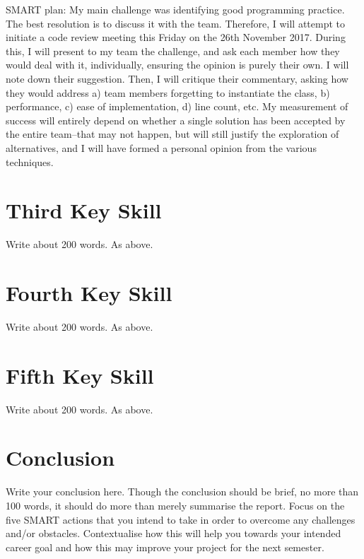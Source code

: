\documentclass{scrartcl}
\begin{document}
SMART plan:
My main challenge was identifying good programming practice. The best resolution is to discuss it with the team. Therefore, I will attempt to initiate a code review meeting this Friday on the 26th November 2017. During this, I will present to my team the challenge, and ask each member how they would deal with it, individually, ensuring the opinion is purely their own. I will note down their suggestion. Then, I will critique their commentary, asking how they would address a) team members forgetting to instantiate the class, b) performance, c) ease of implementation, d) line count, etc. My measurement of success will entirely depend on whether a single solution has been accepted by the entire team--that may not happen, but will still justify the exploration of alternatives, and I will have formed a personal opinion from the various techniques.

\section{Third Key Skill}

Write about 200 words. As above.

\section{Fourth Key Skill}

Write about 200 words. As above.

\section{Fifth Key Skill}

Write about 200 words. As above.

\section{Conclusion}

Write your conclusion here. Though the conclusion should be brief, no more than 100 words, it should do more than merely summarise the report. Focus on the five SMART actions that you intend to take in order to overcome any challenges and/or obstacles. Contextualise how this will help you towards your intended career goal and how this may improve your project for the next semester.



\end{document}
